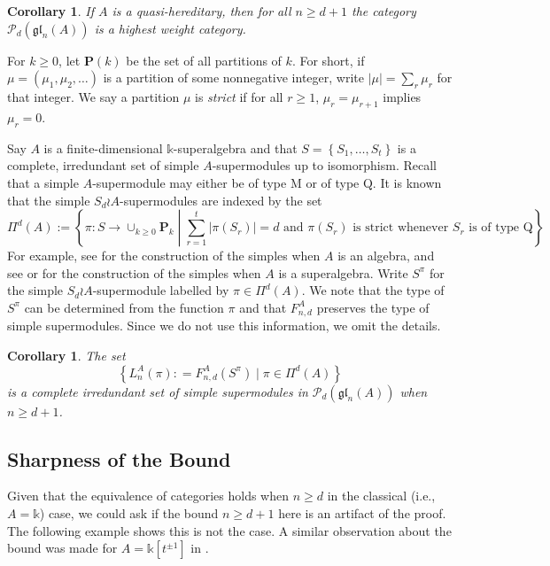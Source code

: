\documentclass[11pt,reqno]{amsart} %
\newtheorem{corollary}[theorem]{Corollary}
\newcommand{\gl}{\mathfrak{gl}}
\renewcommand{\k}{\mathds{k}}
\newcommand{\0}{\bar{0}}
\newcommand{\1}{\bar{1}}
\newcommand{\wreath}{\wr}
\newcommand{\SdwreathA}{S_{d} \wreath A}
\newcommand{\Pol}{\mathcal{P}}
\numberwithin{equation}{subsection}
\begin{document}
\begin{corollary}\label{C:quasi-hereditary}  If $A$ is a quasi-hereditary, then for all $n \geq d+1$ the category $\Pol_{d}(\gl_{n}(A))$ is a highest weight category.
\end{corollary}



For $k \geq 0$, let $\mathbf{P}(k)$ be the set of all partitions of $k$.  For short, if $\mu = (\mu_{1}, \mu_{2}, \dotsc  )$ is a partition of some nonnegative integer, write $|\mu| = \sum_{r} \mu_{r}$ for that integer.  We say a partition $\mu$ is \emph{strict} if for all $r \geq 1$, $\mu_{r} = \mu_{r+1}$ implies $\mu_{r}=0$.

Say $A$ is a finite-dimensional $\k$-superalgebra and that $S = \left\{S_{1}, \dotsc , S_{t} \right\}$ is a complete, irredundant set of simple $A$-supermodules up to isomorphism.  Recall that a simple $A$-supermodule may either be of type M or of type Q. It is known that the simple $\SdwreathA$-supermodules are indexed by the set 
\[
\Pi^{d}(A):= \left\{\pi: S \to \cup_{k \geq 0} \mathbf{P}_{k} \; \left| \; \sum_{r=1}^{t} |\pi (S_{r})|=d \text{ and $\pi(S_{r})$ is strict whenever $S_{r}$ is of type Q} \right.  \right\}.
\] For example, see \cite{MacD} for the construction of the simples when $A$ is an algebra, and see \cite{RossoSavage} or \cite{DKMZ} for the construction of the simples when $A$ is a superalgebra. Write $S^{\pi}$ for the simple $\SdwreathA$-supermodule labelled by $\pi \in \Pi^{d}(A)$.  We note that the type of $S^{\pi}$ can be determined from the function $\pi$ and that $F^{A}_{n,d}$ preserves the type of simple supermodules. Since we do not use this information, we omit the details.

\begin{corollary}\label{C:Classifying-simples}  The set 
\[
\left\{L_{n}^{A}(\pi) : = F^{A}_{n,d}(S^{\pi}) \mid \pi \in \Pi^{d}(A) \right\}
\] is a complete irredundant set of simple supermodules in $\Pol_{d}(\gl_{n}(A))$ when $n \geq d+1$.  
\end{corollary}

\subsection{Sharpness of the Bound}\label{SS:Sharpness}  Given that the equivalence of categories holds when $n\geq d$ in the classical (i.e., $A= \k$) case, we could ask if the bound $n \geq d+1$ here is an artifact of the proof.  The following example shows this is not the case.  A similar observation about the bound was made for $A=\k [t^{\pm 1}]$ in \cite{Flicker}.
\end{document}
